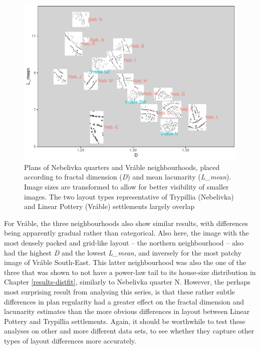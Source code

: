 \documentclass[
  12pt,
]{book}
\begin{document}
\begin{figure}
\hypertarget{fig:09-quarters}{%
\centering
\includegraphics{Results/fig09_quarters.pdf}
\caption{Plans of Nebelivka quarters and Vráble neighbourhoods, placed according to fractal dimension (\emph{D}) and mean lacunarity (\emph{L\_mean}). Image sizes are transformed to allow for better visibility of smaller images. The two layout types representative of Trypillia (Nebelivka) and Linear Pottery (Vráble) settlements largely overlap}\label{fig:09-quarters}
}
\end{figure}

For Vráble, the three neighbourhoods also show similar results, with differences being apparently gradual rather than categorical. Also here, the image with the most densely packed and grid-like layout -- the northern neighbourhood -- also had the highest \emph{D} and the lowest \emph{L\_mean}, and inversely for the most patchy image of Vráble South-East. This latter neighbourhood was also the one of the three that was shown to not have a power-law tail to its house-size distribution in Chapter \ref{results-distfit}, similarly to Nebelivka quarter N. However, the perhaps most surprising result from analysing this series, is that these rather subtle differences in plan regularity had a greater effect on the fractal dimension and lacunarity estimates than the more obvious differences in layout between Linear Pottery and Trypillia settlements. Again, it should be worthwhile to test these analyses on other and more different data sets, to see whether they capture other types of layout differences more accurately.
\end{document}
